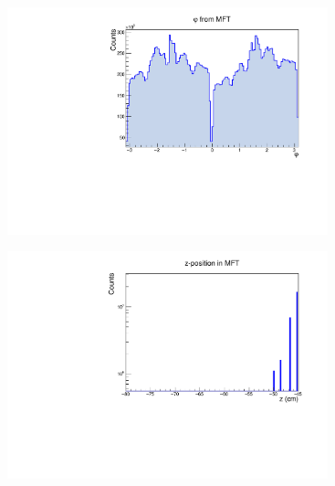 \documentclass[10pt]{beamer}
\begin{document}
\begin{frame}
\begin{columns}
\begin{column}{0.5\textwidth}
\begin{figure}
\begin{center}
                \end{center}
            \end{figure}
        \end{column}
        \begin{column}{0.5\textwidth}
            \vspace*{-0.43cm}
            \begin{figure}
                \begin{center}
                    \includegraphics[width=0.95\textwidth]{Plots/pass3_MFT/phi_pass3.pdf}
                \end{center}
            \end{figure}
            \vspace*{-0.6cm}
            \begin{figure}
                \begin{center}
                    \includegraphics[width=0.95\textwidth]{Plots/pass3_MFT/Z_MFT_pass3.pdf}
                \end{center}
            \end{figure}
        \end{column}
    \end{columns}

\end{frame}
\end{document}
